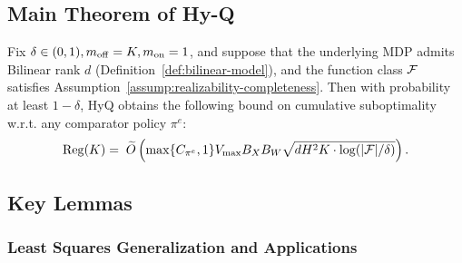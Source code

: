 \subsection{Main Theorem of Hy-Q}
\label{appendix:main-thm-HyQ}
\begin{theorem}
\label{thm:HyQ-regret-decomposition}
    Fix $\delta\in(0,1),m_\mathrm{off}=K,m_\mathrm{on}=1$, and suppose that the underlying MDP admits Bilinear rank $d$ (Definition~\ref{def:bilinear-model}), and the function class $\mathcal F$ satisfies Assumption~\ref{assump:realizability-completeness}. Then with probability at least $1-\delta$, HyQ obtains the following bound on cumulative suboptimality w.r.t. any comparator policy $\pi^e$:
    \begin{equation}
        \begin{split}
        \mathrm{Reg}(K)=\;\widetilde{O}\left( \max\{C_{\pi^e},1\}V_{\max} B_XB_W\sqrt{dH^2K\cdot\log(|\mathcal F|/\delta)} \right).
        \end{split}
    \end{equation}
\end{theorem}


\subsection{Key Lemmas}
\subsubsection{Least Squares Generalization and Applications}

